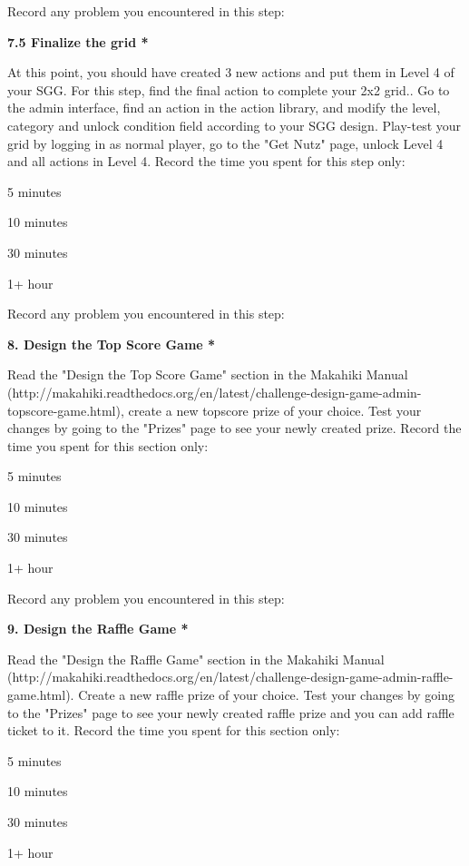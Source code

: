 Record any problem you encountered in this step:

{\bf 7.5 Finalize the grid *}

At this point, you should have created 3 new actions and put them in Level 4 of your SGG. For this step, find the final action to complete your 2x2 grid.. Go to the admin interface, find an action in the action library, and modify the level, category and unlock condition field according to your SGG design. Play-test your grid by logging in as normal player, go to the "Get Nutz" page, unlock Level 4 and all actions in Level 4. Record the time you spent for this step only:

\begin{compactitem}
\item 5 minutes
\item  10 minutes
\item  30 minutes
\item  1+ hour
\end{compactitem}


Record any problem you encountered in this step:

{\bf 8. Design the Top Score Game *}

Read the "Design the Top Score Game" section in the Makahiki Manual (http://makahiki.readthedocs.org/en/latest/challenge-design-game-admin-topscore-game.html), create a new topscore prize of your choice. Test your changes by going to the "Prizes" page to see your newly created prize. Record the time you spent for this section only:

\begin{compactitem}
\item 5 minutes
\item  10 minutes
\item  30 minutes
\item  1+ hour
\end{compactitem}


Record any problem you encountered in this step:

{\bf 9. Design the Raffle Game *}

Read the "Design the Raffle Game" section in the Makahiki Manual (http://makahiki.readthedocs.org/en/latest/challenge-design-game-admin-raffle-game.html). Create a new raffle prize of your choice. Test your changes by going to the "Prizes" page to see your newly created raffle prize and you can add raffle ticket to it. Record the time you spent for this section only:

\begin{compactitem}
\item 5 minutes
\item  10 minutes
\item  30 minutes
\item  1+ hour
\end{compactitem}


